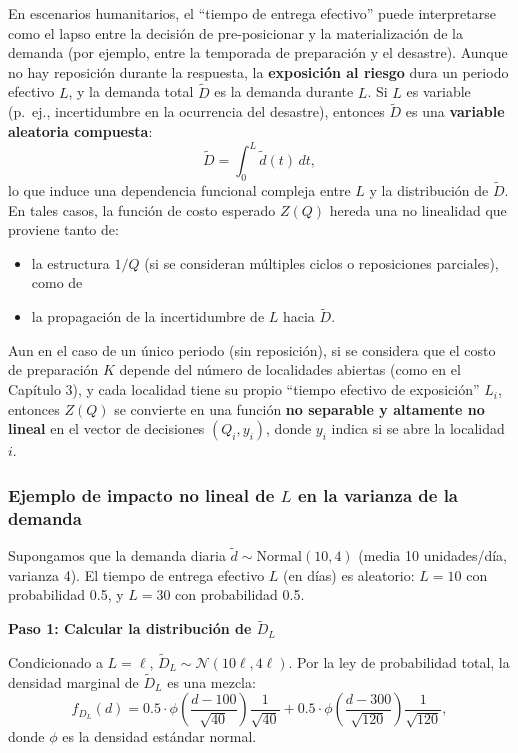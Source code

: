 \documentclass[
  spanish,
  us-letterpaper,
  DIV=11,
  numbers=noendperiod]{scrreprt}
\providecommand{\tightlist}{%
  \setlength{\itemsep}{0pt}\setlength{\parskip}{0pt}}
\numberwithin{equation}{section}
\begin{document}
En escenarios humanitarios, el ``tiempo de entrega efectivo'' puede
interpretarse como el lapso entre la decisión de pre-posicionar y la
materialización de la demanda (por ejemplo, entre la temporada de
preparación y el desastre). Aunque no hay reposición durante la
respuesta, la \textbf{exposición al riesgo} dura un periodo efectivo
\(L\), y la demanda total \(\tilde{D}\) es la demanda durante \(L\). Si
\(L\) es variable (p.~ej., incertidumbre en la ocurrencia del desastre),
entonces \(\tilde{D}\) es una \textbf{variable aleatoria compuesta}: \[
\tilde{D} = \int_0^L \tilde{d}(t) \, dt,
\] lo que induce una dependencia funcional compleja entre \(L\) y la
distribución de \(\tilde{D}\). En tales casos, la función de costo
esperado \(Z(Q)\) hereda una no linealidad que proviene tanto de:

\begin{itemize}
\tightlist
\item
  la estructura \(1/Q\) (si se consideran múltiples ciclos o
  reposiciones parciales), como de
\item
  la propagación de la incertidumbre de \(L\) hacia \(\tilde{D}\).
\end{itemize}

Aun en el caso de un único periodo (sin reposición), si se considera que
el costo de preparación \(K\) depende del número de localidades abiertas
(como en el Capítulo 3), y cada localidad tiene su propio ``tiempo
efectivo de exposición'' \(L_i\), entonces \(Z(Q)\) se convierte en una
función \textbf{no separable y altamente no lineal} en el vector de
decisiones \((Q_i, y_i)\), donde \(y_i\) indica si se abre la localidad
\(i\).

\subsubsection{\texorpdfstring{Ejemplo de impacto no lineal de \(L\) en
la varianza de la
demanda}{Ejemplo de impacto no lineal de L en la varianza de la demanda}}\label{ejemplo-de-impacto-no-lineal-de-l-en-la-varianza-de-la-demanda}

Supongamos que la demanda diaria \(\tilde{d} \sim \text{Normal}(10, 4)\)
(media 10 unidades/día, varianza 4). El tiempo de entrega efectivo \(L\)
(en días) es aleatorio: \(L = 10\) con probabilidad 0.5, y \(L = 30\)
con probabilidad 0.5.

\textbf{Paso 1: Calcular la distribución de \(\tilde{D}_L\)}

Condicionado a \(L = \ell\),
\(\tilde{D}_L \sim \mathcal{N}(10\ell, 4\ell)\). Por la ley de
probabilidad total, la densidad marginal de \(\tilde{D}_L\) es una
mezcla: \[
f_{D_L}(d) = 0.5 \cdot \phi\left( \frac{d - 100}{\sqrt{40}} \right) \frac{1}{\sqrt{40}} + 0.5 \cdot \phi\left( \frac{d - 300}{\sqrt{120}} \right) \frac{1}{\sqrt{120}},
\] donde \(\phi\) es la densidad estándar normal.
\end{document}
